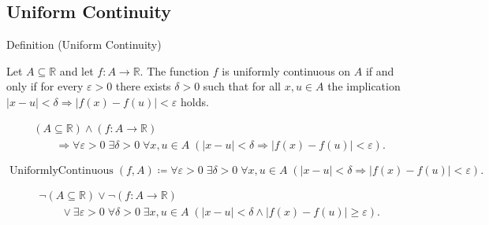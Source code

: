 
\subsection*{Uniform Continuity}
\label{sec:uniform-continuity}

\begin{definitionbox}{Definition (Uniform Continuity)}
\begin{definition}
\label{def:uniform-continuity}
Let $A \subseteq \mathbb{R}$ and let $f:A \to \mathbb{R}$. The function $f$ is uniformly continuous on $A$ if and only if for every $\varepsilon > 0$ there exists $\delta > 0$ such that for all $x,u \in A$ the implication $|x-u| < \delta \Rightarrow |f(x)-f(u)| < \varepsilon$ holds.
\end{definition}
\end{definitionbox}

\begin{remark*}
\[
\begin{aligned}
&(A\subseteq\mathbb{R})\land(f:A\to\mathbb{R})\\
&\qquad\Longrightarrow
\forall \varepsilon > 0 \; \exists \delta > 0 \; \forall x,u \in A \; (|x-u| < \delta \Rightarrow |f(x)-f(u)| < \varepsilon).
\end{aligned}
\]
\end{remark*}

\begin{remark*}
\[
\operatorname{UniformlyContinuous}(f,A) \coloneqq \forall \varepsilon > 0 \; \exists \delta > 0 \; \forall x,u \in A \; (|x-u| < \delta \Rightarrow |f(x)-f(u)| < \varepsilon).
\]
\end{remark*}

\begin{remark*}
\[
\begin{aligned}
&\neg(A\subseteq\mathbb{R})\lor\neg(f:A\to\mathbb{R})\\
&\qquad\lor\exists \varepsilon > 0 \; \forall \delta > 0 \; \exists x,u \in A \; (|x-u| < \delta \land |f(x)-f(u)| \ge \varepsilon).
\end{aligned}
\]
\end{remark*}

